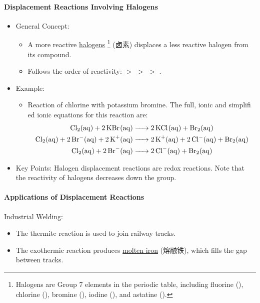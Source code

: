\paragraph{Displacement Reactions Involving Halogens}
\begin{itemize}
    \item General Concept:
    \begin{itemize}
        \item A more reactive \underline{halogens} \footnote{Halogens are Group 7 elements in the periodic table, including
        fluorine (), chlorine (), bromine (), iodine (), and astatine ().} (卤素) displaces a
        less reactive halogen from its compound.
        \item Follows the order of reactivity:  $>$  $>$  $>$ .
    \end{itemize}
    \item Example:
    \begin{itemize}
        \item Reaction of chlorine with potassium bromine. The full, ionic and simplifi ed ionic equations for this reaction are:
        \begin{equation}
            \begin{split}
                \ce{Cl2(aq) + 2KBr(aq) &-> 2KCl(aq) + Br2(aq)}\\
                \ce{Cl2(aq) + 2Br-(aq) + 2K+(aq) &-> 2K+(aq) + 2Cl-(aq) + Br2(aq)}\\
                \ce{Cl2(aq) + 2Br-(aq) &-> 2Cl-(aq) + Br2(aq)}
            \end{split}
        \end{equation}
    \end{itemize}
    \item Key Points: Halogen displacement reactions are redox reactions. Note that the reactivity of halogens decreases down
    the group.
\end{itemize}

\paragraph{Applications of Displacement Reactions} Industrial Welding:
\begin{itemize}
    \item The thermite reaction is used to join railway tracks.
    \item The exothermic reaction produces \underline{molten iron} (熔融铁), which fills the gap between tracks.
\end{itemize}
